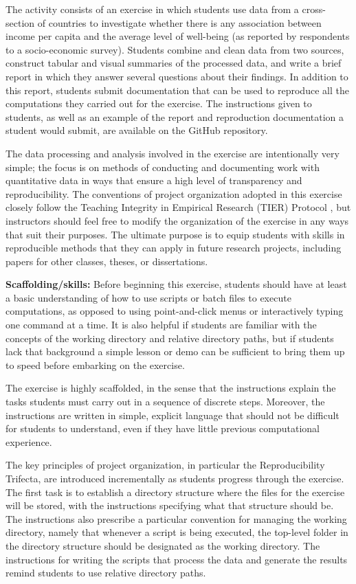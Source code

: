 \documentclass[
  12pt]{article}
\begin{document}
The activity consists of an exercise in which students use data from a cross-section of countries to investigate whether there is any association between income per capita and the average level of well-being (as reported by respondents to a socio-economic survey).  
Students combine and clean data from two sources, construct tabular and visual summaries of the processed data, and write a brief report in which they answer several questions about their findings. 
In addition to this report, students submit documentation that can be used to reproduce all the computations they carried out for the exercise.  
The instructions given to students, as well as an example of the report and reproduction documentation a student would submit, are available on the GitHub repository.

The data processing and analysis involved in the exercise are intentionally very simple; the focus is on methods of conducting and documenting work with quantitative data in ways that ensure a high level of transparency and reproducibility.
The conventions of project organization adopted in this exercise closely follow the Teaching Integrity in Empirical Research (TIER) Protocol \citep{tier}, but instructors should feel free to modify the organization of the exercise in any ways that suit their purposes.
The ultimate purpose is to equip students with skills in reproducible methods that they can apply in future research projects, including papers for other classes, theses, or dissertations.


\textbf{Scaffolding/skills:} Before beginning this exercise, students should have at least a basic understanding of how to use scripts or batch files to execute computations, as opposed to using point-and-click menus or interactively typing one command at a time.
It is also helpful if students are familiar with the concepts of the working directory and relative directory paths, but if students lack that background a simple lesson or demo can be sufficient to bring them up to speed before embarking on the exercise.  

The exercise is highly scaffolded, in the sense that the instructions explain the tasks students must carry out in a sequence of discrete steps.  
Moreover, the instructions are written in simple, explicit language that should not be difficult for students to understand, even if they have little previous computational experience.

The key principles of project organization, in particular the Reproducibility Trifecta, are introduced incrementally as students progress through the exercise.  
The first task is to establish a directory structure where the files for the exercise will be stored, with the instructions specifying what that structure should be. 
The instructions also prescribe a particular convention for managing the working directory, namely that whenever a script is being executed, the top-level folder in the directory structure should be designated as the working directory.  
The instructions for writing the scripts that process the data and generate the results remind students to use relative directory paths.
\end{document}
